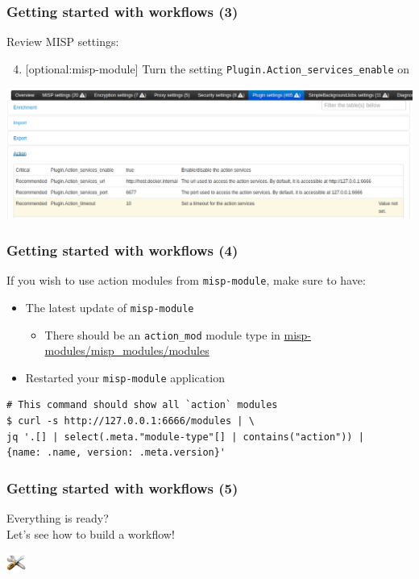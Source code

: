 \begin{frame}
    \frametitle{Getting started with workflows (3)}
    Review MISP settings:
    \begin{enumerate}
        \setcounter{enumi}{3}
        \item {[optional:misp-module]} Turn the setting \texttt{Plugin.Action\_services\_enable} on
    \end{enumerate}
    \begin{center}
        \includegraphics[width=1.0\linewidth]{pictures/settings-1.png}
    \end{center}
\end{frame}

\begin{frame}[fragile]
    \frametitle{Getting started with workflows (4)}
    If you wish to use action modules from \texttt{misp-module}, make sure to have:
    \begin{itemize}
        \item The latest update of \texttt{misp-module}
        \begin{itemize}
            \item There should be an \texttt{action\_mod} module type in \url{misp-modules/misp\_modules/modules}
        \end{itemize}
        \item Restarted your \texttt{misp-module} application
    \end{itemize}
    \vspace{1em}
    \begin{lstlisting}[language=text,firstnumber=1]
# This command should show all `action` modules
$ curl -s http://127.0.0.1:6666/modules | \
jq '.[] | select(.meta."module-type"[] | contains("action")) | 
{name: .name, version: .meta.version}'
    \end{lstlisting}
\end{frame}

\begin{frame}
    \frametitle{Getting started with workflows (5)}
    \centering
    {\Large Everything is ready?}\\
    \vspace*{3em}
    {\LARGE Let's see how to build a workflow!}
    \begin{center}
        \includegraphics[width=24px]{pictures/build-icon.png}
    \end{center}
\end{frame}

